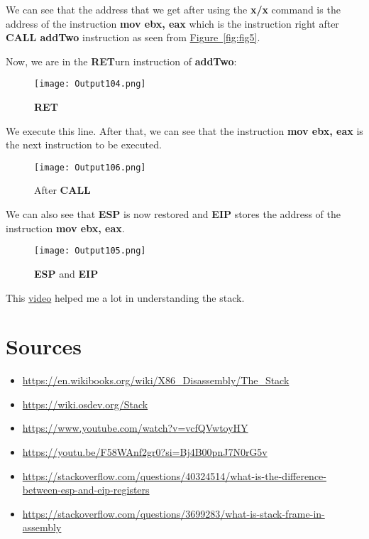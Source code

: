 \documentclass{article}
\begin{document}
We can see that the address that we get after using the \textbf{x/x} command is the address of the instruction \textbf{mov ebx, eax} which is the instruction right after \textbf{CALL addTwo} instruction as seen from \hyperref[fig:fig5]{Figure~\ref{fig:fig5}}.

Now, we are in the \textbf{RET}urn instruction of \textbf{addTwo}:
\begin{figure}[h]
	\centering
	\texttt{[image: Output104.png]}
	\caption{\textbf{RET}}
	\label{fig:fig8}
\end{figure}
\newpage
We execute this line. After that, we can see that the instruction \textbf{mov ebx, eax} is the next instruction to be executed.
\begin{figure}[h]
	\centering
	\texttt{[image: Output106.png]}
	\caption{After \textbf{CALL}}
	\label{fig:fig9}
\end{figure}

We can also see that \textbf{ESP} is now restored and \textbf{EIP} stores the address of the instruction \textbf{mov ebx, eax}.
\begin{figure}[h]
	\centering
	\texttt{[image: Output105.png]}
	\caption{\textbf{ESP} and \textbf{EIP}}
	\label{fig:fig10}
\end{figure}

This \href{https://youtu.be/RU5vUIl1vRs?si=4SnJANio6Tap4lX4}{video} helped me a lot in understanding the stack.
\newpage
\section{Sources}
\begin{itemize}
	\item \url{https://en.wikibooks.org/wiki/X86_Disassembly/The_Stack}
	\item \url{https://wiki.osdev.org/Stack}
	\item \url{https://www.youtube.com/watch?v=vcfQVwtoyHY}
	\item \url{https://youtu.be/F58WAnf2gr0?si=Bj4B00pnJ7N0rG5v}
	\item \href{https://stackoverflow.com/questions/40324514/what-is-the-difference-between-esp-and-eip-registers}{https://stackoverflow.com/questions/40324514/what-is-the-difference-between-esp-and-eip-registers}
	\item \url{https://stackoverflow.com/questions/3699283/what-is-stack-frame-in-assembly}
\end{itemize}
\end{document}
